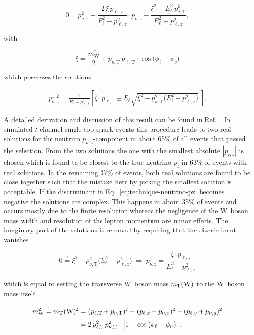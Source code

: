 \begin{equation}
0=p_{\nu,z}^2-\frac{2\,\xi\,p_{\ell,z}}{E_{\ell}^{2}-p_{\ell,z}^2}\cdot p_{\nu,z}-\frac{\xi^{2}-E_{\ell}^{2}\,p_{\nu,\mathrm{T}}^2}{E_{\ell}^{2}-p_{\ell,z}^2},\end{equation}

with

\begin{equation}
\xi=\frac{m_\mathrm{W}^2}{2}+p_{\nu,\mathrm{T}}\,p_{\ell,\mathrm{T}}\cdot\cos\big(\phi_\ell-\phi_\nu\big)
\end{equation}

which possesses the solutions

\begin{align}
p_{\nu,z}^{1,2}=\frac{1}{E_{\ell}^{2}-p_{\ell,z}^{2}}\left[\xi\cdot p_{\ell,z}\pm E_{\ell} \sqrt{\xi^2-p_{\nu,\mathrm{T}}^2\big(E_{\ell}^2-p_{\ell,z}^2\big)}~\right]. \label{eq:technique-neutrino-pz}
\end{align}

A detailed derivation and discussion of this result can be found in Ref.~\cite{Chwalek:1416031}. In simulated $t$-channel single-top-quark events this procedure leads to two real solutions for the neutrino $p_{\nu,z}$-component in about 65\% of all events that passed the selection. From the two solutions the one with the smallest absolute $|p_{\nu,z}|$ is chosen which is found to be closest to the true neutrino $p_{z}$ in 63\% of events with real solutions. In the remaining 37\% of events, both real solutions are found to be close together  such that the mistake here by picking the smallest solution is acceptable. If the discriminant in Eq.~\ref{eq:technique-neutrino-pz} becomes negative the solutions are complex. This happens in about 35\% of events and occurs mostly due to the finite \met resolution whereas the negligence of the W~boson mass width and resolution of the lepton momentum are minor effects. The imaginary part of the solutions is removed by requiring that the discriminant vanishes

\begin{equation}
0\overset{!}{=}\xi^2-p_{\nu,\mathrm{T}}^2\big(E_{\ell}^2-p_{\ell,z}^2\big)~
\Rightarrow~ p_{\nu,z}=\frac{\xi\cdot p_{\ell,z}}{E_{\ell}^{2}-p_{\ell,z}^{2}}
\end{equation}

which is equal to setting the transverse W~boson mass $m_{\mathrm{T}}(\mathrm{W})$ to the W~boson mass itself

\begin{align}
m_\mathrm{W}^2\overset{!}{=}m_{\mathrm{T}}(\mathrm{W})^2&=(p_{\ell,\mathrm{T}}+p_{\nu,\mathrm{T}})^2-(p_{\ell,x}+p_{\nu,x})^{2}-(p_{\ell,y}+p_{\nu,y})^{2}\\
&=2\,p_{\ell,\mathrm{T}}^2\,p_{\nu,\mathrm{T}}^2\cdot\Big[1-\cos\big(\phi_\ell-\phi_\nu\big)\Big].
\end{align}

